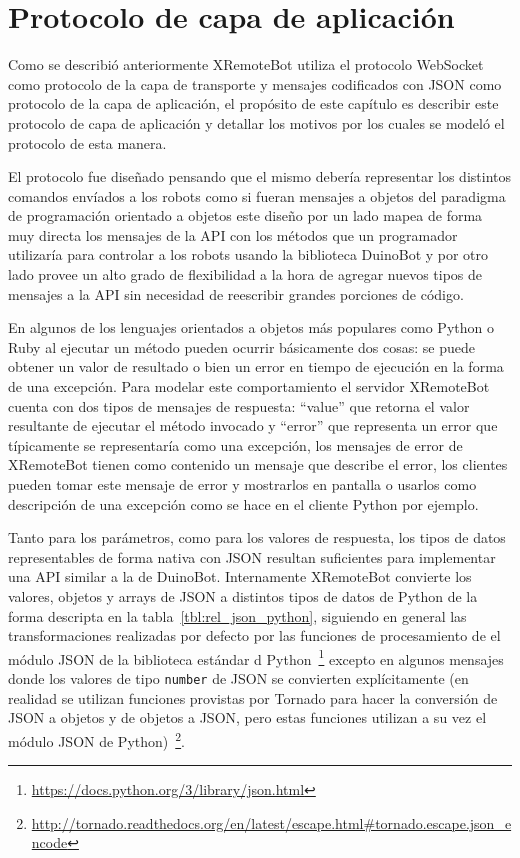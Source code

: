 \chapter{Protocolo de capa de aplicación}\label{ch3}

Como se describió anteriormente XRemoteBot utiliza el protocolo WebSocket como
protocolo de la capa de transporte y mensajes codificados con JSON como
protocolo de la capa de aplicación, el propósito de este capítulo es describir
este protocolo de capa de aplicación y detallar los motivos por los cuales
se modeló el protocolo de esta manera.


El protocolo fue diseñado pensando que el mismo debería representar los
distintos comandos envíados a los robots como si fueran mensajes a objetos
del paradigma de programación orientado a objetos
este diseño por un lado mapea de forma muy directa los mensajes de la API
con los métodos que un programador utilizaría para controlar a los robots
usando la biblioteca DuinoBot y por otro lado provee un alto grado de
flexibilidad a la hora de agregar nuevos tipos de mensajes a la API sin
necesidad de reescribir grandes porciones de código.

En algunos de los lenguajes orientados a objetos más populares como Python
o Ruby al ejecutar un método pueden ocurrir básicamente dos cosas:
se puede obtener un valor de resultado o bien un error
en tiempo de ejecución en la forma de una excepción. Para modelar este
comportamiento el servidor XRemoteBot cuenta con dos tipos de mensajes
de respuesta:
``value'' que retorna el valor resultante de ejecutar el método invocado y
``error'' que representa un error que típicamente se representaría como
una excepción, los mensajes de error de XRemoteBot tienen como contenido
un mensaje que describe el error, los clientes pueden tomar este mensaje
de error y mostrarlos en pantalla o usarlos como descripción de una
excepción como se hace en el cliente Python por ejemplo.

Tanto para los parámetros, como para los valores de respuesta, los tipos
de datos representables de forma nativa con JSON resultan suficientes para
implementar una API similar a la de DuinoBot. Internamente XRemoteBot
convierte los valores, objetos y arrays de JSON a distintos tipos de
datos de Python de la forma descripta en la
tabla~\ref{tbl:rel_json_python}, siguiendo en general las transformaciones
realizadas por defecto por las funciones de procesamiento de el módulo
JSON de la biblioteca estándar d
Python~\footnote{\url{https://docs.python.org/3/library/json.html}}
excepto en algunos mensajes donde los valores de
tipo \texttt{number} de JSON se convierten explícitamente (en realidad
se utilizan funciones provistas por Tornado para hacer la conversión
de JSON a objetos y de objetos a JSON, pero estas funciones utilizan
a su vez el módulo JSON de
Python)~\footnote{\url{http://tornado.readthedocs.org/en/latest/escape.html\#tornado.escape.json_encode}}.

